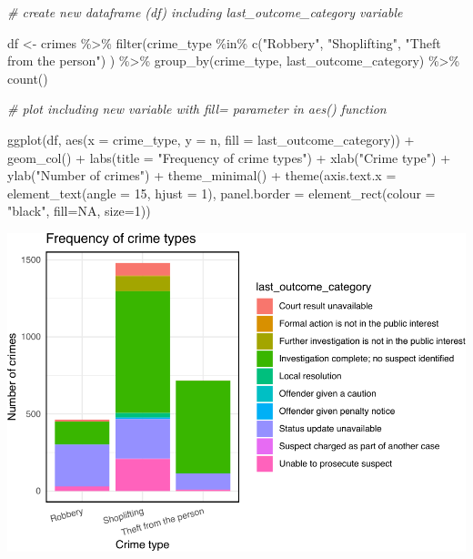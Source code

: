 \documentclass[
  krantz2]{krantz}
\makeatletter
\newenvironment{Shaded}{\begin{snugshade}}{\end{snugshade}}
\newcommand{\AttributeTok}[1]{\textcolor[rgb]{0.61,0.61,0.61}{#1}}
\newcommand{\CommentTok}[1]{\textcolor[rgb]{0.37,0.37,0.37}{\textit{#1}}}
\newcommand{\ConstantTok}[1]{\textcolor[rgb]{0,0,0}{#1}}
\newcommand{\DecValTok}[1]{\textcolor[rgb]{0.06,0.06,0.06}{#1}}
\newcommand{\FunctionTok}[1]{\textcolor[rgb]{0,0,0}{#1}}
\newcommand{\NormalTok}[1]{#1}
\newcommand{\OtherTok}[1]{\textcolor[rgb]{0.37,0.37,0.37}{#1}}
\newcommand{\SpecialCharTok}[1]{\textcolor[rgb]{0,0,0}{#1}}
\newcommand{\StringTok}[1]{\textcolor[rgb]{0.5,0.5,0.5}{#1}}
\newenvironment{kframe}{%
\medskip{}
\setlength{\fboxsep}{.8em}
 \def\at@end@of@kframe{}%
 \ifinner\ifhmode%
  \def\at@end@of@kframe{\end{minipage}}%
  \begin{minipage}{\columnwidth}%
 \fi\fi%
 \def\FrameCommand##1{\hskip\@totalleftmargin \hskip-\fboxsep
 \colorbox{shadecolor}{##1}\hskip-\fboxsep
     \hskip-\linewidth \hskip-\@totalleftmargin \hskip\columnwidth}%
 \MakeFramed {\advance\hsize-\width
   \@totalleftmargin\z@ \linewidth\hsize
   \@setminipage}}%
 {\par\unskip\endMakeFramed%
 \at@end@of@kframe}
\renewenvironment{Shaded}{\begin{kframe}}{\end{kframe}}
\makeatother
\begin{document}
\begin{Shaded}
\begin{Highlighting}[]
\CommentTok{\# create new dataframe (df) including last\_outcome\_category variable}

\NormalTok{df }\OtherTok{\textless{}{-}}\NormalTok{ crimes }\SpecialCharTok{\%\textgreater{}\%} 
  \FunctionTok{filter}\NormalTok{(crime\_type }\SpecialCharTok{\%in\%} \FunctionTok{c}\NormalTok{(}\StringTok{"Robbery"}\NormalTok{, }
                           \StringTok{"Shoplifting"}\NormalTok{, }
                           \StringTok{"Theft from the person"}\NormalTok{)}
\NormalTok{         ) }\SpecialCharTok{\%\textgreater{}\%} 
  \FunctionTok{group\_by}\NormalTok{(crime\_type, last\_outcome\_category) }\SpecialCharTok{\%\textgreater{}\%} 
  \FunctionTok{count}\NormalTok{() }

\CommentTok{\# plot including new variable with fill= parameter in aes() function}

\FunctionTok{ggplot}\NormalTok{(df, }\FunctionTok{aes}\NormalTok{(}\AttributeTok{x =}\NormalTok{ crime\_type, }
               \AttributeTok{y =}\NormalTok{ n, }
               \AttributeTok{fill =}\NormalTok{ last\_outcome\_category)) }\SpecialCharTok{+} 
  \FunctionTok{geom\_col}\NormalTok{() }\SpecialCharTok{+} 
  \FunctionTok{labs}\NormalTok{(}\AttributeTok{title =} \StringTok{"Frequency of crime types"}\NormalTok{) }\SpecialCharTok{+} 
  \FunctionTok{xlab}\NormalTok{(}\StringTok{"Crime type"}\NormalTok{) }\SpecialCharTok{+} 
  \FunctionTok{ylab}\NormalTok{(}\StringTok{"Number of crimes"}\NormalTok{) }\SpecialCharTok{+} 
  \FunctionTok{theme\_minimal}\NormalTok{() }\SpecialCharTok{+} 
  \FunctionTok{theme}\NormalTok{(}\AttributeTok{axis.text.x =} \FunctionTok{element\_text}\NormalTok{(}\AttributeTok{angle =} \DecValTok{15}\NormalTok{, }
                                   \AttributeTok{hjust =} \DecValTok{1}\NormalTok{), }
        \AttributeTok{panel.border =} \FunctionTok{element\_rect}\NormalTok{(}\AttributeTok{colour =} \StringTok{"black"}\NormalTok{, }
                                    \AttributeTok{fill=}\ConstantTok{NA}\NormalTok{, }
                                    \AttributeTok{size=}\DecValTok{1}\NormalTok{))}
\end{Highlighting}
\end{Shaded}

\includegraphics{crime_mapping_files/figure-latex/unnamed-chunk-12-1.pdf}
\end{document}
